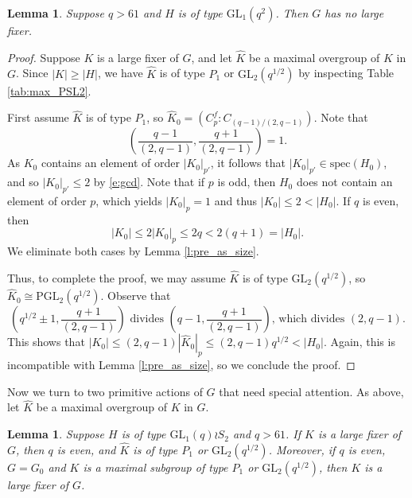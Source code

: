 \documentclass[twoside,a4paper,reqno,11pt]{amsart}
\newcommand{\<}{\langle}
\renewcommand{\>}{\rangle}
\newcommand{\leqs}{\leqslant}
\newcommand{\geqs}{\geqslant}
\newcommand{\GL}{\mathrm{GL}}
\newcommand{\PGL}{\mathrm{PGL}}
\newcommand{\Spec}{\mathrm{spec}}
\newtheorem{lem}[thm]{Lemma}
\theoremstyle{definition}
\begin{document}
	
	\begin{lem}
		\label{l:PSL2_C3}
		Suppose $q> 61$ and $H$ is of type $\GL_1(q^2)$. Then $G$ has no large fixer.
	\end{lem}
	
	\begin{proof}
		Suppose $K$ is a large fixer of $G$, and let $\widehat{K}$ be a maximal overgroup of $K$ in $G$. Since $|K|\geqs |H|$, we have $\widehat{K}$ is of type $P_1$ or $\GL_2(q^{1/2})$ by inspecting Table \ref{tab:max_PSL2}.
		
		First assume $\widehat{K}$ is of type $P_1$, so $\widehat{K}_0 = (C_p^f{:}C_{(q-1)/(2,q-1)})$. Note that
		\begin{equation}
		\label{e:gcd}
		\left(\frac{q-1}{(2,q-1)},\frac{q+1}{(2,q-1)}\right) = 1.
		\end{equation}
		As $K_0$ contains an element of order $|K_0|_{p'}$, it follows that $|K_0|_{p'}\in\Spec(H_0)$, and so  $|K_0|_{p'}\leqs 2$ by \eqref{e:gcd}. Note that if $p$ is odd, then $H_0$ does not contain an element of order $p$, which yields $|K_0|_p = 1$ and thus $|K_0|\leqs 2 < |H_0|$. If $q$ is even, then
		\begin{equation*}
		|K_0| \leqs  2|K_0|_p\leqs 2q < 2(q+1) = |H_0|.
		\end{equation*}
		We eliminate both cases by Lemma \ref{l:pre_as_size}.
		
		Thus, to complete the proof, we may assume $\widehat{K}$ is of type $\GL_2(q^{1/2})$, so $\widehat{K}_0\cong\PGL_2(q^{1/2})$. Observe that
		\begin{equation*}
		\left(q^{1/2}\pm 1,\frac{q+1}{(2,q-1)}\right)\text{ divides }\left(q-1,\frac{q+1}{(2,q-1)}\right)\text{, which divides }(2,q-1).
		\end{equation*}
		This shows that $|K_0|\leqs (2,q-1)|\widehat{K}_0|_p\leqs (2,q-1)q^{1/2} < |H_0|$. Again, this is incompatible with Lemma \ref{l:pre_as_size}, so we conclude the proof.
	\end{proof}
	
	Now we turn to two primitive actions of $G$ that need special attention. As above, let $\widehat{K}$ be a maximal overgroup of $K$ in $G$.
	
	\begin{lem}
		\label{l:PSL2_C2}
		Suppose $H$ is of type $\GL_1(q)\wr S_2$ and $q > 61$. If $K$ is a large fixer of $G$, then $q$ is even, and $\widehat{K}$ is of type $P_1$ or $\GL_2(q^{1/2})$. Moreover, if $q$ is even, $G = G_0$ and $K$ is a maximal subgroup of type $P_1$ or $\GL_2(q^{1/2})$, then $K$ is a large fixer of $G$.
	\end{lem}
	
\end{document}
